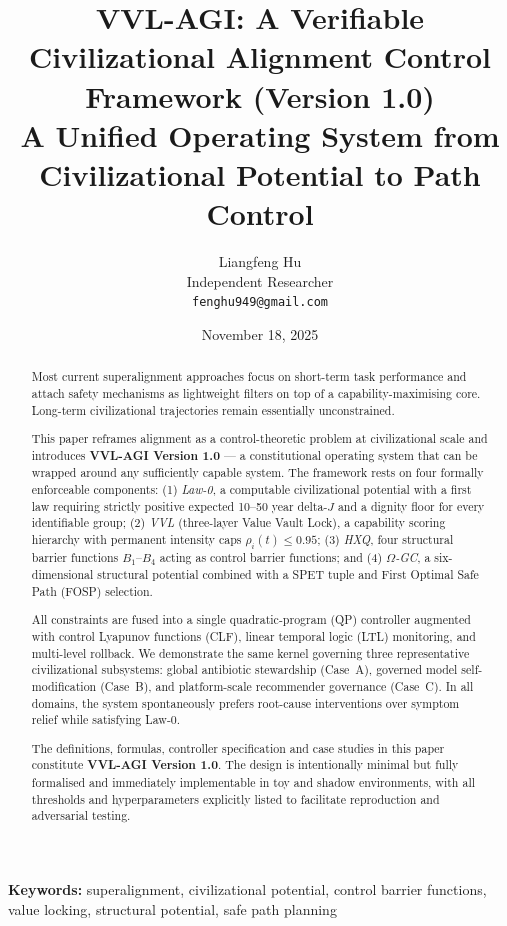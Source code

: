 \documentclass[11pt]{article}
\title{\textbf{VVL-AGI: A Verifiable Civilizational Alignment Control Framework (Version 1.0)}\\[0.25em]
{\large A Unified Operating System from Civilizational Potential to Path Control}}
\author{
  Liangfeng Hu\\[0.25em]
  \small Independent Researcher\\
  \small \texttt{fenghu949@gmail.com}
}
\date{November 18, 2025}
\begin{document}
\maketitle

\begin{abstract}
Most current superalignment approaches focus on short-term task performance and attach safety mechanisms as lightweight filters on top of a capability-maximising core. Long-term civilizational trajectories remain essentially unconstrained.

This paper reframes alignment as a control-theoretic problem at civilizational scale and introduces \textbf{VVL-AGI Version 1.0} --- a constitutional operating system that can be wrapped around any sufficiently capable system. The framework rests on four formally enforceable components: (1) \emph{Law-0}, a computable civilizational potential with a first law requiring strictly positive expected 10--50 year delta-$J$ and a dignity floor for every identifiable group; (2) \emph{VVL} (three-layer Value Vault Lock), a capability scoring hierarchy with permanent intensity caps $\rho_i(t)\le 0.95$; (3) \emph{HXQ}, four structural barrier functions $B_1$--$B_4$ acting as control barrier functions; and (4) \emph{$\Omega$-GC}, a six-dimensional structural potential combined with a SPET tuple and First Optimal Safe Path (FOSP) selection.

All constraints are fused into a single quadratic-program (QP) controller augmented with control Lyapunov functions (CLF), linear temporal logic (LTL) monitoring, and multi-level rollback. We demonstrate the same kernel governing three representative civilizational subsystems: global antibiotic stewardship (Case~A), governed model self-modification (Case~B), and platform-scale recommender governance (Case~C). In all domains, the system spontaneously prefers root-cause interventions over symptom relief while satisfying Law-0.

The definitions, formulas, controller specification and case studies in this paper constitute \textbf{VVL-AGI Version 1.0}. The design is intentionally minimal but fully formalised and immediately implementable in toy and shadow environments, with all thresholds and hyperparameters explicitly listed to facilitate reproduction and adversarial testing.
\end{abstract}

\bigskip
\noindent\textbf{Keywords:} superalignment, civilizational potential, control barrier functions, value locking, structural potential, safe path planning
\end{document}
